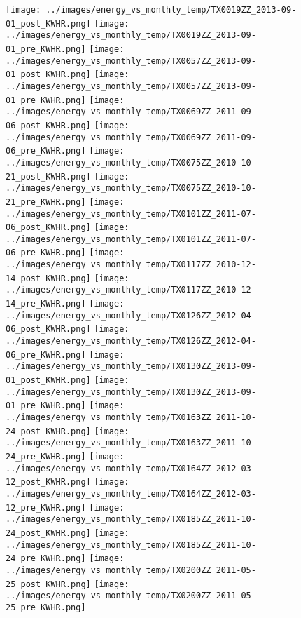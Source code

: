\clearpage
\begin{figure}
\centering
\texttt{[image: ../images/energy\_vs\_monthly\_temp/TX0019ZZ\_2013-09-01\_post\_KWHR.png]}
\texttt{[image: ../images/energy\_vs\_monthly\_temp/TX0019ZZ\_2013-09-01\_pre\_KWHR.png]}
\texttt{[image: ../images/energy\_vs\_monthly\_temp/TX0057ZZ\_2013-09-01\_post\_KWHR.png]}
\texttt{[image: ../images/energy\_vs\_monthly\_temp/TX0057ZZ\_2013-09-01\_pre\_KWHR.png]}
\texttt{[image: ../images/energy\_vs\_monthly\_temp/TX0069ZZ\_2011-09-06\_post\_KWHR.png]}
\texttt{[image: ../images/energy\_vs\_monthly\_temp/TX0069ZZ\_2011-09-06\_pre\_KWHR.png]}
\texttt{[image: ../images/energy\_vs\_monthly\_temp/TX0075ZZ\_2010-10-21\_post\_KWHR.png]}
\texttt{[image: ../images/energy\_vs\_monthly\_temp/TX0075ZZ\_2010-10-21\_pre\_KWHR.png]}
\texttt{[image: ../images/energy\_vs\_monthly\_temp/TX0101ZZ\_2011-07-06\_post\_KWHR.png]}
\texttt{[image: ../images/energy\_vs\_monthly\_temp/TX0101ZZ\_2011-07-06\_pre\_KWHR.png]}
\texttt{[image: ../images/energy\_vs\_monthly\_temp/TX0117ZZ\_2010-12-14\_post\_KWHR.png]}
\texttt{[image: ../images/energy\_vs\_monthly\_temp/TX0117ZZ\_2010-12-14\_pre\_KWHR.png]}
\texttt{[image: ../images/energy\_vs\_monthly\_temp/TX0126ZZ\_2012-04-06\_post\_KWHR.png]}
\texttt{[image: ../images/energy\_vs\_monthly\_temp/TX0126ZZ\_2012-04-06\_pre\_KWHR.png]}
\texttt{[image: ../images/energy\_vs\_monthly\_temp/TX0130ZZ\_2013-09-01\_post\_KWHR.png]}
\texttt{[image: ../images/energy\_vs\_monthly\_temp/TX0130ZZ\_2013-09-01\_pre\_KWHR.png]}
\texttt{[image: ../images/energy\_vs\_monthly\_temp/TX0163ZZ\_2011-10-24\_post\_KWHR.png]}
\texttt{[image: ../images/energy\_vs\_monthly\_temp/TX0163ZZ\_2011-10-24\_pre\_KWHR.png]}
\texttt{[image: ../images/energy\_vs\_monthly\_temp/TX0164ZZ\_2012-03-12\_post\_KWHR.png]}
\texttt{[image: ../images/energy\_vs\_monthly\_temp/TX0164ZZ\_2012-03-12\_pre\_KWHR.png]}
\texttt{[image: ../images/energy\_vs\_monthly\_temp/TX0185ZZ\_2011-10-24\_post\_KWHR.png]}
\texttt{[image: ../images/energy\_vs\_monthly\_temp/TX0185ZZ\_2011-10-24\_pre\_KWHR.png]}
\texttt{[image: ../images/energy\_vs\_monthly\_temp/TX0200ZZ\_2011-05-25\_post\_KWHR.png]}
\texttt{[image: ../images/energy\_vs\_monthly\_temp/TX0200ZZ\_2011-05-25\_pre\_KWHR.png]}
\end{figure}

